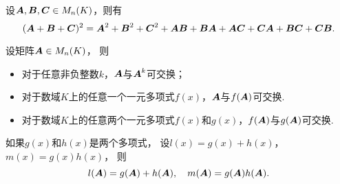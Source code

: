 \begin{example}
设\(\boldsymbol{A},\boldsymbol{B},\boldsymbol{C} \in M_n(K)\)，则有\begin{equation*}
	(\boldsymbol{A} + \boldsymbol{B} + \boldsymbol{C})^2
	= \boldsymbol{A}^2 + \boldsymbol{B}^2 + \boldsymbol{C}^2 + \boldsymbol{A}\boldsymbol{B} + \boldsymbol{B}\boldsymbol{A} + \boldsymbol{A}\boldsymbol{C} + \boldsymbol{C}\boldsymbol{A} + \boldsymbol{B}\boldsymbol{C} + \boldsymbol{C}\boldsymbol{B}.
\end{equation*}
\end{example}

\begin{theorem}
设矩阵\(\boldsymbol{A} \in M_n(K)\)，
则\begin{itemize}
	\item 对于任意非负整数\(k\)，\(\boldsymbol{A}\)与\(\boldsymbol{A}^k\)可交换；
	\item 对于数域\(K\)上的任意一个一元多项式\(f(x)\)，\(\boldsymbol{A}\)与\(f(\boldsymbol{A})\)可交换.
	\item 对于数域\(K\)上的任意两个一元多项式\(f(x)\)和\(g(x)\)，\(f(\boldsymbol{A})\)与\(g(\boldsymbol{A})\)可交换.
\end{itemize}
\end{theorem}

\begin{theorem}
如果\(g(x)\)和\(h(x)\)是两个多项式，
设\(l(x) = g(x) + h(x)\)，\(m(x) = g(x) h(x)\)，
则\begin{equation*}
	l(\boldsymbol{A}) = g(\boldsymbol{A}) + h(\boldsymbol{A}),
	\quad
	m(\boldsymbol{A}) = g(\boldsymbol{A}) h(\boldsymbol{A}).
\end{equation*}
\end{theorem}

